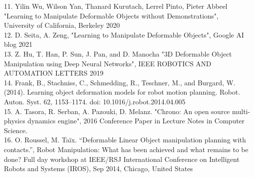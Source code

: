 \documentclass[12pt,a4paper]{report}
\begin{document}
11. Yilin Wu, Wilson Yan, Thanard Kurutach, Lerrel Pinto, Pieter Abbeel "Learning to Manipulate Deformable Objects without Demonstrations", University of California, Berkeley 2020\\
12. D. Seita, A. Zeng, "Learning to Manipulate Deformable Objects", Google AI blog 2021\\
13. Z. Hu, T. Han, P. Sun, J. Pan, and D. Manocha "3D Deformable Object Manipulation using Deep Neural Networks", IEEE ROBOTICS AND AUTOMATION LETTERS 2019\\
14. Frank, B., Stachniss, C., Schmedding, R., Teschner, M., and Burgard, W. (2014). Learning object deformation models for robot motion planning. Robot. Auton. Syst. 62, 1153–1174. doi: 10.1016/j.robot.2014.04.005\\
15. A. Tasora, R. Serban, A. Pazouki, D. Melanz. "Chrono: An open source multi-physics dynamics engine", 2016 Conference Paper in Lecture Notes in Computer Science. \\
16. O. Roussel, M. Taïx. “Deformable Linear Object manipulation planning with contacts.”, Robot Manipulation: What has been achieved and what remains to be done? Full day workshop at IEEE/RSJ International Conference on Intelligent Robots and Systems (IROS), Sep 2014, Chicago, United States
\end{document}
